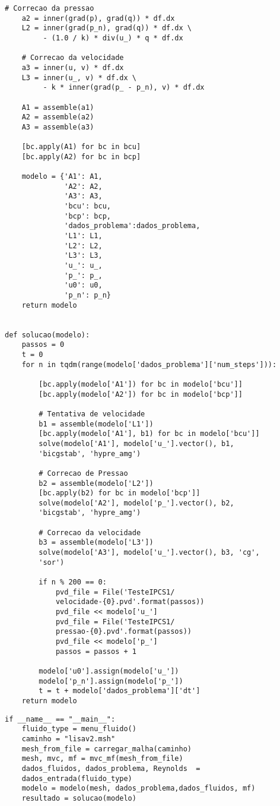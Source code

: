 \begin{lstlisting}[title=\phantom{}]
    # Correcao da pressao
    a2 = inner(grad(p), grad(q)) * df.dx
    L2 = inner(grad(p_n), grad(q)) * df.dx \
         - (1.0 / k) * div(u_) * q * df.dx

    # Correcao da velocidade
    a3 = inner(u, v) * df.dx
    L3 = inner(u_, v) * df.dx \
         - k * inner(grad(p_ - p_n), v) * df.dx

    A1 = assemble(a1)
    A2 = assemble(a2)
    A3 = assemble(a3)

    [bc.apply(A1) for bc in bcu]
    [bc.apply(A2) for bc in bcp]

    modelo = {'A1': A1,
              'A2': A2,
              'A3': A3,
              'bcu': bcu,
              'bcp': bcp,
              'dados_problema':dados_problema,
              'L1': L1,
              'L2': L2,
              'L3': L3,
              'u_': u_,
              'p_': p_,
              'u0': u0,
              'p_n': p_n}
    return modelo


def solucao(modelo):
    passos = 0
    t = 0
    for n in tqdm(range(modelo['dados_problema']['num_steps'])):
        
        [bc.apply(modelo['A1']) for bc in modelo['bcu']]
        [bc.apply(modelo['A2']) for bc in modelo['bcp']]

        # Tentativa de velocidade
        b1 = assemble(modelo['L1'])
        [bc.apply(modelo['A1'], b1) for bc in modelo['bcu']]
        solve(modelo['A1'], modelo['u_'].vector(), b1,
        'bicgstab', 'hypre_amg')

        # Correcao de Pressao
        b2 = assemble(modelo['L2'])
        [bc.apply(b2) for bc in modelo['bcp']]
        solve(modelo['A2'], modelo['p_'].vector(), b2,
        'bicgstab', 'hypre_amg')

        # Correcao da velocidade
        b3 = assemble(modelo['L3'])
        solve(modelo['A3'], modelo['u_'].vector(), b3, 'cg',
        'sor')

        if n % 200 == 0:
            pvd_file = File('TesteIPCS1/
            velocidade-{0}.pvd'.format(passos))
            pvd_file << modelo['u_']
            pvd_file = File('TesteIPCS1/
            pressao-{0}.pvd'.format(passos))
            pvd_file << modelo['p_']
            passos = passos + 1

        modelo['u0'].assign(modelo['u_'])
        modelo['p_n'].assign(modelo['p_'])
        t = t + modelo['dados_problema']['dt']
    return modelo
\end{lstlisting}

\begin{lstlisting}[title=\phantom{}]
if __name__ == "__main__":
    fluido_type = menu_fluido()
    caminho = "lisav2.msh"
    mesh_from_file = carregar_malha(caminho)
    mesh, mvc, mf = mvc_mf(mesh_from_file)
    dados_fluidos, dados_problema, Reynolds  =
    dados_entrada(fluido_type)
    modelo = modelo(mesh, dados_problema,dados_fluidos, mf)
    resultado = solucao(modelo)
\end{lstlisting}

